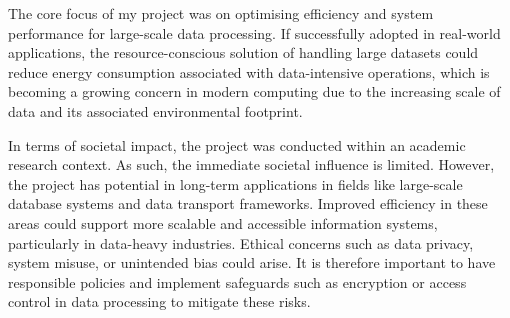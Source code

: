 The core focus of my project was on optimising efficiency and system performance for large-scale data processing. If successfully adopted in real-world applications, the resource-conscious solution of handling large datasets could reduce energy consumption associated with data-intensive operations, which is becoming a growing concern in modern computing due to the increasing scale of data and its associated environmental footprint.

In terms of societal impact, the project was conducted within an academic research context. As such, the immediate societal influence is limited. However, the project has potential in long-term applications in fields like large-scale database systems and data transport frameworks. Improved efficiency in these areas could support more scalable and accessible information systems, particularly in data-heavy industries. Ethical concerns such as data privacy, system misuse, or unintended bias could arise. It is therefore important to have responsible policies and implement safeguards such as encryption or access control in data processing to mitigate these risks. 

